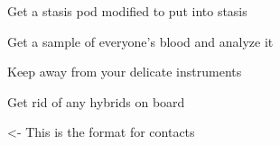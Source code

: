 \documentclass[char]{guildcamp4}
\begin{document}
\begin{itemz}[Goals]
	\item Get a stasis pod modified to put \cPlead{} into stasis
	\item Get a sample of everyone's blood and analyze it
	\item Keep \cJames{} away from your delicate instruments
	\item Get rid of any hybrids on board
\end{itemz}

\begin{itemz}[Notes]
	\item 
\end{itemz}

\begin{contacts}
	\contact{\cVone{}} <- This is the format for contacts 
	\contact{\cVtwo{}}
	\contact{\cJoan{}}
	\contact{\cJulie{}}
	\contact{\cJames{}}
	\contact{\cRasputin{}}
	\contact{\cSpite{}}
	\contact{\cPlead{}}
\end{contacts}
\end{document}
